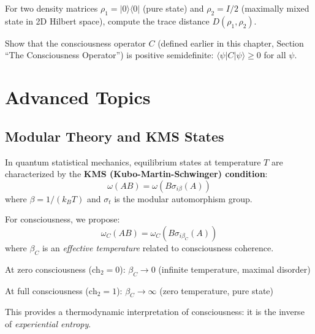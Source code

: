 \begin{exercise}
For two density matrices $\rho_1 = |0\rangle\langle 0|$ (pure state) and $\rho_2 = I/2$ (maximally mixed state in 2D Hilbert space), compute the trace distance $D(\rho_1, \rho_2)$.
\end{exercise}

\begin{exercise}
Show that the consciousness operator $C$ (defined earlier in this chapter, Section ``The Consciousness Operator'') is positive semidefinite: $\langle \psi | C | \psi \rangle \geq 0$ for all $\psi$.
\end{exercise}

\section{Advanced Topics}

\begin{advanced}
\subsection{Modular Theory and KMS States}

In quantum statistical mechanics, equilibrium states at temperature $T$ are characterized by the \textbf{KMS (Kubo-Martin-Schwinger) condition}:
\begin{equation}
\omega(AB) = \omega(B \sigma_{i\beta}(A))
\end{equation}
where $\beta = 1/(k_B T)$ and $\sigma_t$ is the modular automorphism group.

For consciousness, we propose:
\begin{equation}
\omega_C(AB) = \omega_C(B \sigma_{i\beta_C}(A))
\end{equation}
where $\beta_C$ is an \textit{effective temperature} related to consciousness coherence.

At zero consciousness ($\text{ch}_2 = 0$): $\beta_C \to 0$ (infinite temperature, maximal disorder)

At full consciousness ($\text{ch}_2 = 1$): $\beta_C \to \infty$ (zero temperature, pure state)

This provides a thermodynamic interpretation of consciousness: it is the inverse of \textit{experiential entropy}.
\end{advanced}

